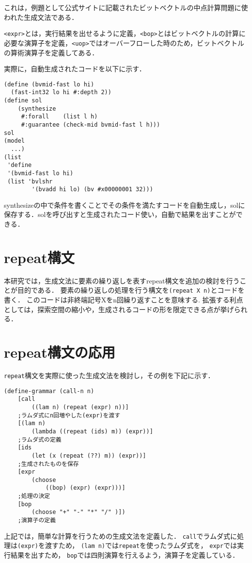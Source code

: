 \documentclass[twocolumn]{jsarticle}
\begin{document}
これは，例題として公式サイト\cite{reason}に記載されたビットベクトルの中点計算問題に使われた生成文法である．

\verb|<expr>|とは，実行結果を出せるように定義，\verb|<bop>|とはビットベクトルの計算に必要な演算子を定義，\verb|<uop>|ではオーバーフローした時のため，ビットベクトルの算術演算子を定義してある．

実際に，自動生成されたコードを以下に示す．
\setlength{\baselineskip}{10pt}
\begin{verbatim}
(define (bvmid-fast lo hi)
  (fast-int32 lo hi #:depth 2))
(define sol
    (synthesize
     #:forall    (list l h)
     #:guarantee (check-mid bvmid-fast l h)))
sol
(model
  ...)
(list
 'define
 '(bvmid-fast lo hi)
 (list 'bvlshr 
        '(bvadd hi lo) (bv #x00000001 32)))
\end{verbatim}
synthesizeの中で条件を書くことでその条件を満たすコードを自動生成し，solに保存する．solを呼び出すと生成されたコード使い，自動で結果を出すことができる．

\section{repeat構文}
本研究では，生成文法に要素の繰り返しを表すrepeat構文を追加の検討を行うことが目的である．
要素の繰り返しの処理を行う構文を\verb|(repeat X n)|とコードを書く．
このコードは非終端記号Xをn回繰り返すことを意味する.
拡張する利点としては，探索空間の縮小や，生成されるコードの形を限定できる点が挙げられる．

\section{repeat構文の応用}

\verb|repeat|構文を実際に使った生成文法を検討し，その例を下記に示す．

\setlength{\baselineskip}{10pt}
\begin{verbatim}
(define-grammar (call-n n)
    [call
        ((lam n) (repeat (expr) n))]
    ;ラムダ式にn回増やした(expr)を渡す
    [(lam n)
        (lambda ((repeat (ids) m)) (expr))]
    ;ラムダ式の定義
    [ids 
        (let (x (repeat (??) m)) (expr))]
    ;生成されたものを保存
    [expr 
        (choose 
            ((bop) (expr) (expr)))]
    ;処理の決定
    [bop 
        (choose "+" "-" "*" "/" )])
    ;演算子の定義
\end{verbatim}

上記では，簡単な計算を行うための生成文法を定義した．
\verb|call|でラムダ式に処理は\verb|(expr)|を渡すため，
\verb|(lam n)|では\verb|repeat|を使ったラムダ式を，
\verb|expr|では実行結果を出すため，
\verb|bop|では四則演算を行えるよう，演算子を定義している．
\end{document}
